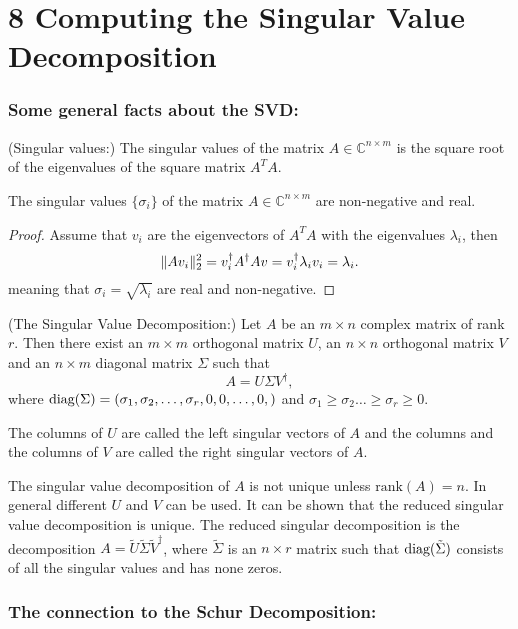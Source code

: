 \section*{8 Computing the Singular Value Decomposition}

\subsubsection*{Some general facts about the SVD:}
\begin{definition}(Singular values:)
	The singular values of the matrix $A\in\mathbb C^{n\times m}$ is the 
	square root of the eigenvalues of the square matrix $A^TA$.
\end{definition}
\begin{theorem}
	The singular values $\{\sigma_i\}$ of the matrix $A\in\mathbb C^{n\times m}$ 
	are non-negative and real.
\end{theorem}
\begin{proof}
	Assume that $v_i$ are the eigenvectors of $A^TA$ with the eigenvalues $\lambda_i$,
	then 
	\[
		\lVert{Av_i}\rVert_2^2 = v_i^\dagger A^\dagger A v = v_i^\dagger \lambda_i v_i = \lambda_i. 
	\]
	meaning that $\sigma_i = \sqrt{\lambda_i}$ are real and non-negative.
\end{proof}
\begin{theorem}(The Singular Value Decomposition:)
	Let $A$ be an $m\times n$ complex matrix of rank $r$. Then there exist an $m\times m$
	orthogonal matrix $U$, an $n\times n$ orthogonal matrix $V$ and an $n\times m$ diagonal 
	matrix $\Sigma$ such that 
	\[
		A = U \Sigma V^\dagger,
	\]
	where $\text{diag}{(}\Sigma) = (\sigma_1,\sigma_2,\dots,\sigma_r, 0,0,\dots,0,)$ and 
	$\sigma_1\ge\sigma_2\dots\ge\sigma_r\ge0$.
\end{theorem}
\begin{definition}
	The columns of $U$ are called the left singular vectors of $A$ and the columns and the 
	columns of $V$ are called the right singular vectors of $A$.
\end{definition}
The singular value decomposition of $A$ is not unique unless $\text{rank}(A)=n$. In general 
different $U$ and $V$ can be used. It can be shown that the reduced singular value decomposition
is unique. 
The reduced singular decomposition is the decomposition 
$A = \tilde U\tilde \Sigma\tilde V^\dagger$, where $\tilde\Sigma$ is an $n\times r$
matrix such that $\text{diag}{}(\tilde\Sigma)$ consists of all the singular values and has none zeros.

\subsubsection*{The connection to the Schur Decomposition:}

